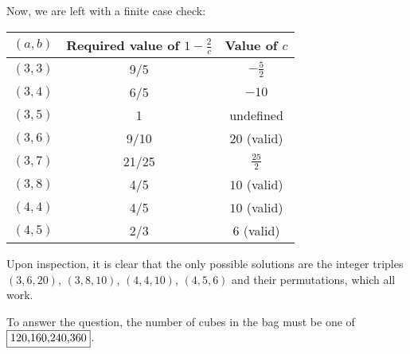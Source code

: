 \documentclass[10pt]{../usamts}
\begin{document}
\begin{solution}
Now, we are left with a finite case check:

\begin{center}
\begin{tabular}{c | c | c}
    $(a,b)$ & Required value of $1-\frac{2}{c}$ & Value of $c$\\\hline
    $(3,3)$ & 9/5 & $-\frac{5}{2}$ \\
    $(3,4)$ & 6/5 & $-10$ \\
    $(3,5)$ & 1 & undefined \\
    $(3,6)$ & 9/10 & $20$ (valid) \\
    $(3,7)$ & 21/25 & $\frac{25}{2}$ \\
    $(3,8)$ & 4/5 & $10$ (valid) \\
    $(4,4)$ & 4/5 & $10$ (valid) \\
    $(4,5)$ & 2/3 & $6$ (valid) \\
\end{tabular}
\end{center}

Upon inspection, it is clear that the only possible solutions are the integer triples $(3,6,20)$, $(3,8,10)$, $(4,4,10)$, $(4,5,6)$ and their permutations, which all work.

To answer the question, the number of cubes in the bag must be one of $\fbox{120,160,240,360}$.

\end{solution}
\end{document}
